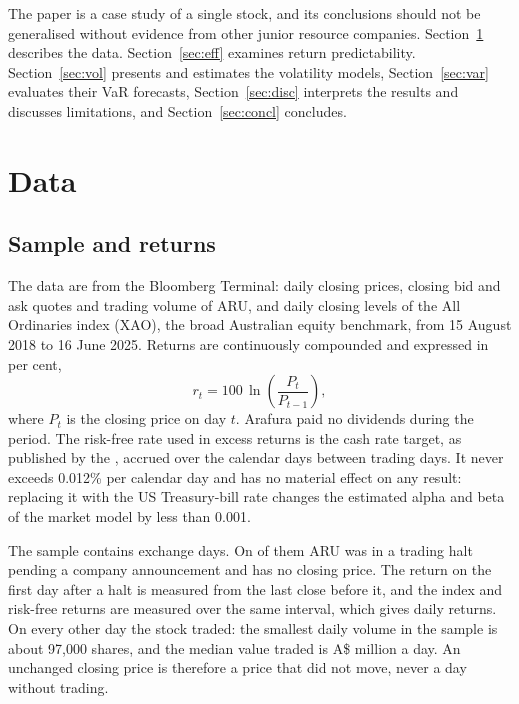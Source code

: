 \documentclass[11pt,a4paper]{article}
\begin{document}
The paper is a case study of a single stock, and its conclusions should not be generalised without evidence from other junior resource companies. Section~\ref{sec:data} describes the data. Section~\ref{sec:eff} examines return predictability. Section~\ref{sec:vol} presents and estimates the volatility models, Section~\ref{sec:var} evaluates their VaR forecasts, Section~\ref{sec:disc} interprets the results and discusses limitations, and Section~\ref{sec:concl} concludes.

\section{Data}\label{sec:data}

\subsection{Sample and returns}

The data are from the Bloomberg Terminal: daily closing prices, closing bid and ask quotes and trading volume of ARU, and daily closing levels of the All Ordinaries index (XAO), the broad Australian equity benchmark, from 15 August 2018 to 16 June 2025. Returns are continuously compounded and expressed in per cent,
\begin{equation}
r_t = 100\,\ln\!\left(\frac{P_t}{P_{t-1}}\right),
\end{equation}
where $P_t$ is the closing price on day $t$. Arafura paid no dividends during the period. The risk-free rate used in excess returns is the cash rate target, as published by the \citet{rba2025}, accrued over the calendar days between trading days. It never exceeds 0.012\% per calendar day and has no material effect on any result: replacing it with the US Treasury-bill rate changes the estimated alpha and beta of the market model by less than 0.001.

The sample contains \nDays{} exchange days. On \nHalt{} of them ARU was in a trading halt pending a company announcement and has no closing price. The return on the first day after a halt is measured from the last close before it, and the index and risk-free returns are measured over the same interval, which gives \nUsed{} daily returns. On every other day the stock traded: the smallest daily volume in the sample is about 97,000 shares, and the median value traded is A\$\liqMedian{} million a day. An unchanged closing price is therefore a price that did not move, never a day without trading.
\end{document}
